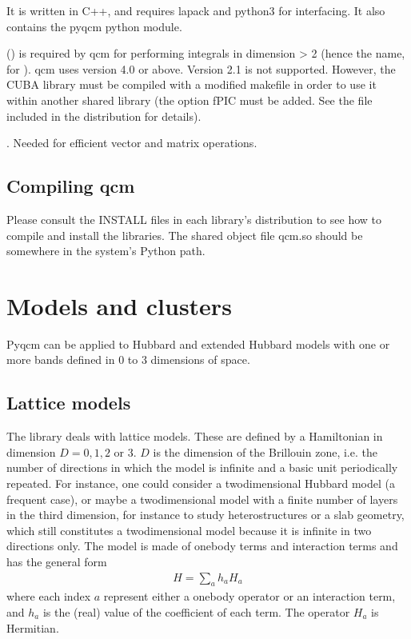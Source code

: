 \documentclass[letterpaper,10pt,english]{sphinxmanual}
\begin{document}
\sphinxAtStartPar
It is written in C++, and requires lapack and python3 for interfacing. It also contains the pyqcm python module.

\sphinxAtStartPar
{} () is required by qcm for performing integrals in dimension \textgreater{} 2 (hence the name, for ). qcm uses version 4.0 or above. Version 2.1 is not supported. However, the CUBA library must be compiled with a modified makefile in order to use it within another shared library (the option \sphinxhyphen{}fPIC must be added. See the file  included in the distribution for details).

\sphinxAtStartPar
{}. Needed for efficient vector and matrix operations.


\section{Compiling qcm}
\label{\detokenize{intro:compiling-qcm}}
\sphinxAtStartPar
Please consult the INSTALL files in each library’s distribution to see how to compile and install the libraries.
The shared object file qcm.so should be somewhere in the system’s Python path.


\chapter{Models and clusters}
\label{\detokenize{models:models-and-clusters}}\label{\detokenize{models::doc}}
\sphinxAtStartPar
Pyqcm can be applied to Hubbard and extended Hubbard models with one or more bands defined in 0 to 3 dimensions of space.


\section{Lattice models}
\label{\detokenize{models:lattice-models}}
\sphinxAtStartPar
The  library deals with lattice models.
These are defined by a Hamiltonian in dimension \(D=0,1,2\) or 3.
\(D\) is the dimension of the Brillouin zone, i.e. the number of directions in which the model is infinite and a basic unit periodically repeated. For instance, one could consider a two\sphinxhyphen{}dimensional Hubbard model (a frequent case), or maybe a two\sphinxhyphen{}dimensional model with a finite number of layers in the third dimension, for instance to study heterostructures or a slab geometry, which still constitutes a two\sphinxhyphen{}dimensional model because it is infinite in two directions only. The model is made of one\sphinxhyphen{}body terms and interaction terms and has the general form
\begin{equation*}
\begin{split}H = \sum_a h_a H_a\end{split}
\end{equation*}
\sphinxAtStartPar
where each index \(a\) represent either a one\sphinxhyphen{}body operator or an interaction term, and \(h_a\) is the (real) value of the coefficient of each term. The operator \(H_a\) is Hermitian.
\end{document}
